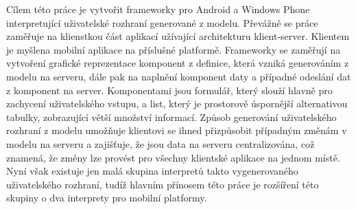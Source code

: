 \documentclass[11pt,twoside,a4paper]{book}
\begin{document}
	\noindent
	Cílem této práce je vytvořit frameworky pro Android a Windows Phone interpretující uživatelské rozhraní generované z modelu. Převážně se práce zaměřuje na klienstkou část aplikací užívající architekturu klient-server. Klientem je myšlena mobilní aplikace na příslušné platformě. Frameworky se zaměřují na vytvoření grafické reprezentace komponent z definice, která vzniká generováním z modelu na serveru, dále pak na naplnění komponent daty a případné odeslání dat z komponent na server. Komponentami jsou formulář, který slouží hlavně pro zachycení uživatelského vstupu, a list, který je prostorově úspornější alternativou tabulky, zobrazující větší množství informací. Způsob generování uživatelského rozhraní z modelu umožňuje klientovi se ihned přizpůsobit případným změnám v modelu na serveru a zajišťuje, že jsou data na serveru centralizována, což znamená, že změny lze provést pro všechny klientské aplikace na jednom místě. Nyní však existuje jen malá skupina interpretů takto vygenerovaného uživatelského rozhraní, tudíž hlavním přínosem této práce je rozšíření této skupiny o dva interprety pro mobilní platformy.
	\noindent

	\tableofcontents		%

	\listoffigures			%
	\listoftables			%

	\mainbodystarts

% 
% 








\end{document}
